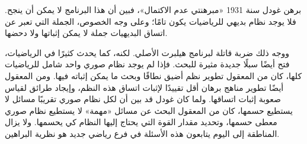 \documentclass[../../../include/open-logic-section]{subfiles}
\begin{document}
برهن غودل سنة 1931 «مبرهنتي عدم الاكتمال»، فبين أن هذا البرنامج لا
يمكن أن ينجح. فلا يوجد نظام بديهي للرياضيات يكون تامًا؛ وعلى وجه
الخصوص، الجملة التي تعبر عن اتساق البديهيات جملة لا يمكن إثباتها ولا
دحضها.

ووجه ذلك ضربة قاتلة لبرنامج هيلبرت الأصلي. لكنه، كما يحدث كثيرًا في
الرياضيات، فتح أيضًا سبلًا جديدة مثيرة للبحث. فإذا لم يوجد نظام صوري
واحد شامل للرياضيات كلها، كان من المعقول تطوير نظم أضيق نطاقًا وبحث
ما يمكن إثباته فيها. ومن المعقول أيضًا تطوير مناهج برهان أقل تقييدًا
لإثبات اتساق هذه النظم، وإيجاد طرائق لقياس صعوبة إثبات اتساقها. ولما
كان غودل قد بين أن لكل نظام صوري تقريبًا مسائل لا يستطيع حسمها، كان
من المعقول البحث عن مسائل «مهمة» لا يستطيع نظام صوري معطى حسمها،
وتحديد مقدار القوة التي يحتاج إليها النظام كي يحسمها. ولا يزال
المناطقة إلى اليوم يتابعون هذه الأسئلة في فرع رياضي جديد هو نظرية
البراهين.
\end{document}

